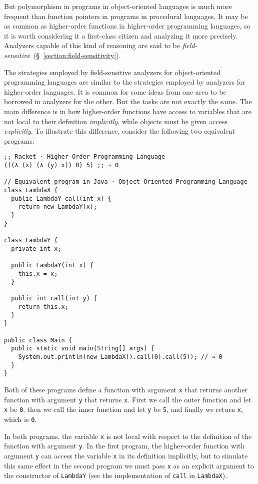 \documentclass[12pt, oneside]{book}
\begin{document}
But polymorphism in programs in object-oriented languages is much more frequent than function pointers in programs in procedural languages. It may be as common as higher-order functions in higher-order programming languages, so it is worth considering it a first-class citizen and analyzing it more precisely. Analyzers capable of this kind of reasoning are said to be \emph{field-sensitive}~(§~\ref{section:field-sensitivity}).

The strategies employed by field-sensitive analyzers for object-oriented programming languages are similar to the strategies employed by analyzers for higher-order languages. It is common for some ideas from one area to be borrowed in analyzers for the other. But the tasks are not exactly the same. The main difference is in how higher-order functions have access to variables that are not local to their definition \emph{implicitly}, while objects must be given access \emph{explicitly}. To illustrate this difference, consider the following two equivalent programs:

\begin{Verbatim}
;; Racket · Higher-Order Programming Language
(((λ (x) (λ (y) x)) 0) 5) ;; ⇒ 0

// Equivalent program in Java · Object-Oriented Programming Language
class LambdaX {
  public LambdaY call(int x) {
    return new LambdaY(x);
  }
}

class LambdaY {
  private int x;

  public LambdaY(int x) {
    this.x = x;
  }

  public int call(int y) {
    return this.x;
  }
}

public class Main {
  public static void main(String[] args) {
    System.out.println(new LambdaX().call(0).call(5)); // ⇒ 0
  }
}
\end{Verbatim}

Both of these programs define a function with argument \texttt{x} that returns another function with argument \texttt{y} that returns \texttt{x}. First we call the outer function and let \texttt{x} be \texttt{0}, then we call the inner function and let \texttt{y} be \texttt{5}, and finally we return \texttt{x}, which is \texttt{0}.

In both programs, the variable \texttt{x} is not local with respect to the definition of the function with argument \texttt{y}. In the first program, the higher-order function with argument \texttt{y} can access the variable \texttt{x} in its definition implicitly, but to simulate this same effect in the second program we must pass \texttt{x} as an explicit argument to the constructor of \texttt{LambdaY} (see the implementation of \texttt{call} in \texttt{LambdaX}).
\end{document}
